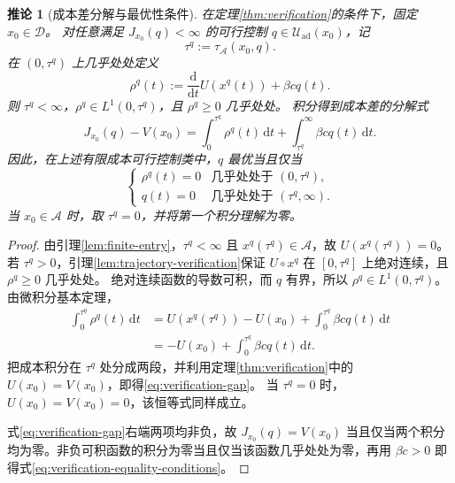 \documentclass[lang=cn,a4paper,newtx]{elegantpaper}
\theoremstyle{plain}
\newtheorem{papercorollary}[theorem]{推论}
\theoremstyle{definition}
\newcommand{\Acal}{\mathcal A}
\newcommand{\Dcal}{\mathcal D}
\newcommand{\Uad}{\mathcal U_{\mathrm{ad}}}
\newcommand{\dd}{\,\mathrm d}
\begin{document}
\begin{papercorollary}[成本差分解与最优性条件]
\label{cor:verification-equality}
在定理\ref{thm:verification}的条件下，固定 $x_0\in\Dcal$。
对任意满足 $J_{x_0}(q)<\infty$ 的可行控制 $q\in\Uad(x_0)$，记
\[
\tau^q:=\tau_{\Acal}(x_0,q).
\]
在 $(0,\tau^q)$ 上几乎处处定义
\begin{equation}
\rho^q(t):=\frac{\mathrm d}{\mathrm d t}U(x^q(t))+\beta cq(t).
\label{eq:trajectory-verification-residual}
\end{equation}
则 $\tau^q<\infty$，$\rho^q\in L^1(0,\tau^q)$，且 $\rho^q\ge0$ 几乎处处。
积分得到成本差的分解式
\begin{equation}
J_{x_0}(q)-V(x_0)
=
\int_0^{\tau^q}\rho^q(t)\dd t
+
\int_{\tau^q}^{\infty}\beta cq(t)\dd t.
\label{eq:verification-gap}
\end{equation}
因此，在上述有限成本可行控制类中，$q$ 最优当且仅当
\begin{equation}
\begin{cases}
\rho^q(t)=0 & \text{几乎处处于 }(0,\tau^q),\\
q(t)=0 & \text{几乎处处于 }(\tau^q,\infty).
\end{cases}
\label{eq:verification-equality-conditions}
\end{equation}
当 $x_0\in\Acal$ 时，取 $\tau^q=0$，并将第一个积分理解为零。
\end{papercorollary}

\begin{proof}
由引理\ref{lem:finite-entry}，$\tau^q<\infty$ 且 $x^q(\tau^q)\in\Acal$，故 $U(x^q(\tau^q))=0$。
若 $\tau^q>0$，引理\ref{lem:trajectory-verification}保证 $U\circ x^q$ 在 $[0,\tau^q]$ 上绝对连续，且 $\rho^q\ge0$ 几乎处处。
绝对连续函数的导数可积，而 $q$ 有界，所以 $\rho^q\in L^1(0,\tau^q)$。
由微积分基本定理，
\begin{align*}
\int_0^{\tau^q}\rho^q(t)\dd t
&=U(x^q(\tau^q))-U(x_0)
  +\int_0^{\tau^q}\beta cq(t)\dd t\\
&=-U(x_0)+\int_0^{\tau^q}\beta cq(t)\dd t.
\end{align*}
把成本积分在 $\tau^q$ 处分成两段，并利用定理\ref{thm:verification}中的 $U(x_0)=V(x_0)$，即得\eqref{eq:verification-gap}。
当 $\tau^q=0$ 时，$U(x_0)=V(x_0)=0$，该恒等式同样成立。

式\eqref{eq:verification-gap}右端两项均非负，故 $J_{x_0}(q)=V(x_0)$ 当且仅当两个积分均为零。非负可积函数的积分为零当且仅当该函数几乎处处为零，再用 $\beta c>0$ 即得式\eqref{eq:verification-equality-conditions}。
\end{proof}
\end{document}
